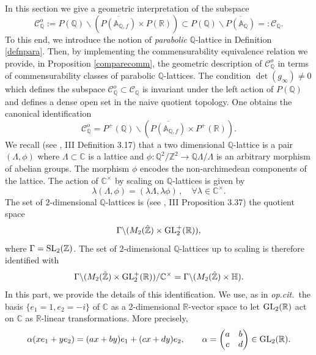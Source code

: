\documentclass[graybox, envcountsect%
]{svmult}
\def\GL{{\rm GL}}
\def\SL{{\rm SL}}
\def\A{{\mathbb A}}
\def\C{{\mathbb C}}
\def\Q{{\mathbb Q}}
\def\R{{\mathbb R}}
\def\Z{{\mathbb Z}}
\def\H{{\mathbb H}}
\def\cC{{\mathcal C}}
\def\caq{{\cC_\Q}}
\def\caqo{{\cC_\Q^o}}
\newcommand{\opcit}{{\it op.cit.\/}\ }
\begin{document}
In this section we give  a geometric interpretation of the subspace
$$
\caqo:=P(\Q)\backslash (\overline{P(\A_{\Q,f})}\times P(\R))\subset P(\Q)\backslash
\overline{P(\A_\Q)}=:\caq.
$$
To this end, we introduce the notion of {\em parabolic} $\Q$-lattice in Definition \ref{defnpara}. Then, by implementing the commensurability equivalence relation we provide, in Proposition \ref{comparecomm}, the geometric description of $\caqo$
in terms of commensurability classes of  parabolic $\Q$-lattices.  The condition $\det(g_\infty)\neq 0$ which defines the subspace $\caqo\subset \caq$ is invariant under the left action of $P(\Q)$ and defines a dense open set in the naive quotient topology.  One obtains the canonical identification 
\begin{equation}\label{adelquot2dQlattpar}
\caqo=P^+(\Q)\backslash (\overline{P(\A_{\Q,f})}\times P^+(\R)).
\end{equation}
 We recall (see \cite{cmbook}, III Definition 3.17) that a two dimensional $\Q$-lattice is  a pair $(\Lambda,\phi)$ where $\Lambda\subset \C$ is a lattice and $\phi:\Q^2/\Z^2 \to \Q\Lambda / \Lambda$ is an arbitrary morphism of abelian groups. The morphism $\phi$ encodes the non-archimedean components of the lattice. The action of $\C^\times$ by scaling on $\Q$-lattices is given by
\begin{equation}\label{scaleQlat2}
\lambda(\Lambda,\phi)=(\lambda\Lambda,\lambda\phi) \,,\quad \forall
\lambda \in \C^\times.
\end{equation}
 The set of $2$-dimensional $\Q$-lattices is (see \cite{cmbook}, III Proposition 3.37) the quotient space
\begin{equation}\label{2dQlat}
\Gamma\backslash (M_2(\hat\Z)\times \GL_2^+(\R)),
\end{equation}
where $\Gamma=\SL_2(\Z)$. The set of 2-dimensional $\Q$-lattices up
to scaling is therefore identified with 
\begin{equation}\label{2dQlatScale}
\Gamma\backslash (M_2(\hat\Z)\times \GL_2^+(\R))/\C^\times=\Gamma\backslash (M_2(\hat\Z)\times \H).
\end{equation}
In this part, we provide the details of this identification. We use, as in \opcit  the basis $\{e_1=1,e_2=-i\}$ of $\C$ as a
2-dimensional $\R$-vector space to let $\GL_2 (\R)$ act on $\C$ as
$\R$-linear transformations. More precisely,
\begin{equation}\label{actalpha}
\alpha(x e_1 + y e_2) = (a x+ b y) e_1 + (cx+ dy) e_2, \qquad \alpha=\begin{pmatrix} a &b \\
c &d \end{pmatrix} \in \GL_2 (\R).
\end{equation}
\end{document}
